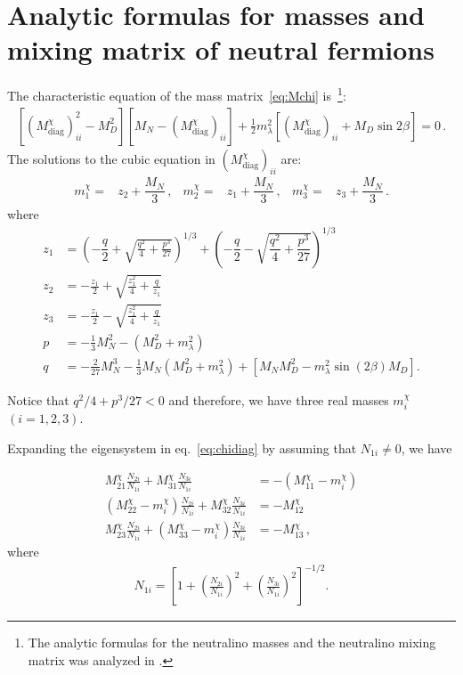 \section{Analytic formulas for masses and mixing matrix of neutral fermions}
\label{sec:analyt-form-mass}

The characteristic equation of the mass matrix~\eqref{eq:Mchi}
is~\cite{Cheung:2013dua}\footnote{The analytic formulas for the neutralino
  masses and the neutralino mixing matrix was
  analyzed in \cite{ElKheishen:1992yv}.}:
\begin{align}
\left[\left({M}^{\chi}_{\text{diag}}\right)_{ii}^2-M_D^2\right]
\left[M_N-\left({M}^{\chi}_{\text{diag}}\right)_{ii}^{\phantom{2}}
\right]
+\tfrac{1}{2}m_{\lambda}^2\left[\left({M}^{\chi}_{\text{diag}}\right)_{ii}+M_D\sin 2\beta
\right]=0\,.
\label{eq:characteristic-equation}
\end{align}
The solutions to the cubic equation in  $\left({M}^{\chi}_{\text{diag}}\right)_{ii}$ are:
\begin{align}
m_1^\chi=&z_2+\dfrac{M_N}{3}\,,&
m_2^\chi=&z_1+\dfrac{M_N}{3}\,, &
m_3^\chi=&z_3+\dfrac{M_N}{3}\,.
\end{align}
where
\begin{align}
z_1&=\left(-\dfrac{q}{2}+\sqrt{\frac{q^2}{4}+\frac{p^3}{27}}\right)^{1/3} + \left(-\dfrac{q}{2}-\sqrt{\dfrac{q^2}{4}+\dfrac{p^3}{27}}\right)^{1/3}\nonumber\\ 
z_2&=-\frac{z_1}{2}+\sqrt{\frac{z_1^2}{4}+\frac{q}{z_1}} \nonumber\\ 
z_3&=-\frac{z_1}{2}-\sqrt{\frac{z_1^2}{4}+\frac{q}{z_1}}\nonumber\\ 
p&=-\frac{1}{3}M_N^2-\left(M_D^2+m_{\lambda}^2\right)  \nonumber\\ 
q&=-\frac{2}{27}M_N^3-\frac{1}{3}M_N\left(M_D^2+m_{\lambda}^2\right)+\left[M_NM_D^2-m_{\lambda}^2\sin(2\beta) M_D\right].
\end{align}

Notice that ${q^2}/{4}+{p^3}/{27} < 0$ and therefore, we have three real masses $m_i^\chi$ $(i=1,2,3)$.

Expanding the eigensystem in eq.~\eqref{eq:chidiag} by  assuming  that ${N}_{1i}\neq 0$, we have 

\begin{align*}
{M}^{\chi}_{21}\frac{{N}_{2i}}{{N}_{1i}}+{M}^{\chi}_{31}\frac{{N}_{3i}}{{N}_{1i}}&=-({M}^{\chi}_{11}-m_i^\chi)\nonumber \\
({M}^{\chi}_{22}-m_i^\chi)\frac{{N}_{2i}}{{N}_{1i}}+{M}^{\chi}_{32}\frac{{N}_{3i}}{{N}_{1i}}&=-{M}^{\chi}_{12} \nonumber\\
{M}^{\chi}_{23}\frac{{N}_{2i}}{{N}_{1i}}+({M}^{\chi}_{33}-m_i^\chi)\frac{{N}_{3i}}{{N}_{1i}}&=-{M}^{\chi}_{13}\,,
\end{align*}
where
\begin{align}
\label{eq:N1i}
{N}_{1i}=\left[1+\left(\frac{{N}_{2i}}{{N}_{1i}}\right)^2+\left(\frac{{N}_{3i}}{{N}_{1i}}\right)^2\right]^{-1/2}.
\end{align}


